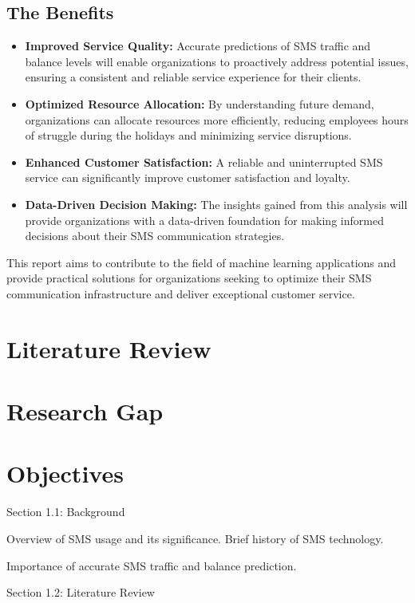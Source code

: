 \documentclass[12pt]{book} %
\begin{document}
\subsection{The Benefits}
\begin{itemize}
		\item \textbf{Improved Service Quality:} Accurate predictions of SMS traffic and balance levels will enable organizations to proactively address potential issues, ensuring a consistent and reliable service experience for their clients.
        \item \textbf{Optimized Resource Allocation:}  By understanding future demand, organizations can allocate resources more efficiently, reducing employees hours of struggle during the holidays and minimizing service disruptions.
        \item \textbf{Enhanced Customer Satisfaction:} A reliable and uninterrupted SMS service can significantly improve customer satisfaction and loyalty.
        \item \textbf{Data-Driven Decision Making:} The insights gained from this analysis will provide organizations with a data-driven foundation for making informed decisions about their SMS communication strategies.
\end{itemize}


This report aims to contribute to the field of machine learning applications and provide practical solutions for organizations seeking to optimize their SMS communication infrastructure and deliver exceptional customer service.





\section{Literature Review}
\section{Research Gap}
\section{Objectives}


Section 1.1: Background

    Overview of SMS usage and its significance.
    Brief history of SMS technology.

    Importance of accurate SMS traffic and balance prediction.

Section 1.2: Literature Review
\end{document}

